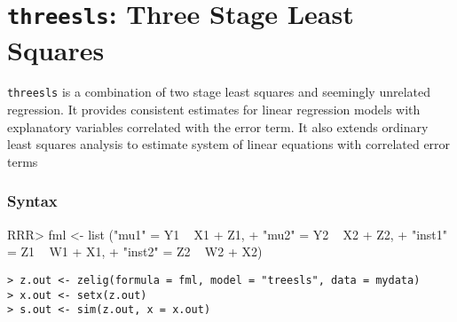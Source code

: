 \section{{\tt threesls}: Three Stage Least Squares}
\label{threesls}

\texttt{threesls} is a combination of two stage least squares
and seemingly unrelated regression. It provides consistent estimates for linear regression models with 
explanatory variables correlated with the error term. It also extends ordinary least squares 
analysis to estimate system of linear equations with correlated error terms
\subsubsection{Syntax}
\begin{Schunk}
\begin{Sinput}
RRR>  fml <- list ("mu1"  = Y1 ~ X1 + Z1,
+                "mu2"  = Y2 ~ X2 + Z2,
+                "inst1" = Z1 ~ W1 + X1,
+                "inst2" = Z2 ~ W2 + X2)
\end{Sinput}
\end{Schunk}
\begin{verbatim}
> z.out <- zelig(formula = fml, model = "treesls", data = mydata)
> x.out <- setx(z.out)
> s.out <- sim(z.out, x = x.out)
\end{verbatim}
